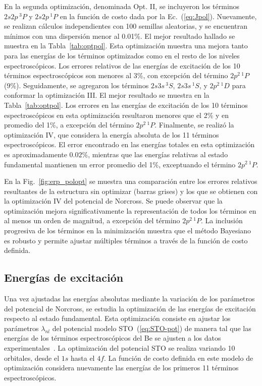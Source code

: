 En la segunda optimización, denominada Opt. II, se incluyeron los 
términos $2s2p\,^3\!P$ y $2s2p\,^1\!P$ en la función de costo dada por la 
Ec.~(\ref{eq:Jpol}). Nuevamente, se realizan cálculos independientes con 
100 semillas aleatorias, y se encuentran mínimos con una dispersión 
menor al 0.01\%. El mejor resultado hallado se muestra en la 
Tabla~\ref{tab:optpol}. Esta optimización muestra una mejora tanto para 
las energías de los términos optimizados como en el resto de los niveles 
espectroscópicos. Los errores relativos de las energías de excitación de 
los 10 términos espectroscópicos son menores al 3\%, con excepción del 
término $2p^2\,^1\!P$ (9\%). Seguidamente, se agregaron los términos 
$2s3s\,^3\!S$, $2s3s\,^1\!S$, y $2p^2\,^1\!D$ para conformar la optimización
III. El mejor resultado se muestra en la Tabla~\ref{tab:optpol}. Los 
errores en las energías de excitación de los 10 términos 
espectroscópicos en esta optimización resultaron menores que el 2\% y en 
promedio del 1\%, a excepción del término $2p^2\,^1\!P$. Finalmente, se 
realizó la optimización IV, que considera la energía absoluta de los 11 
términos espectroscópicos. El error encontrado en las energías totales 
en esta optimización es aproximadamente $0.02\%$, mientras que las 
energías relativas al estado fundamental mantienen un error promedio del 
1\%, exceptuando el término $2p^2\,^1\!P$. 

En la Fig.~\ref{fig:erp_polopt} se muestra una comparación entre los 
errores relativos resultantes de la estructura sin optimizar (barras 
grises) y los que se obtienen con la optimización IV del potencial de 
Norcross. Se puede observar que la optimización mejora 
significativamente la representación de todos los términos en al menos
un orden de magnitud, a excepción del término $2p^2\,^1\!P$. La inclusión
progresiva de los términos en la minimización muestra que el método 
Bayesiano es robusto y permite ajustar múltiples términos a través de 
la función de costo definida.

\subsection{Energías de excitación}

Una vez ajustadas las energías absolutas mediante la variación de los 
parámetros del potencial de Norcross, se estudia la optimización de las 
energías de excitación respecto al estado fundamental. Esta optimización 
consiste en ajustar los parámetros $\lambda_{nl}$ del potencial modelo 
STO~(\ref{eq:STO-pot}) de manera tal que las energías de los términos 
espectroscópicos del Be se ajusten a los datos 
experimentales~\cite{NIST}. 
La optimización del potencial STO se realiza variando 10 orbitales, 
desde el $1s$ hasta el $4f$. La función de costo definida en este modelo 
de optimización considera nuevamente las energías de los primeros 11 
términos espectroscópicos. 

